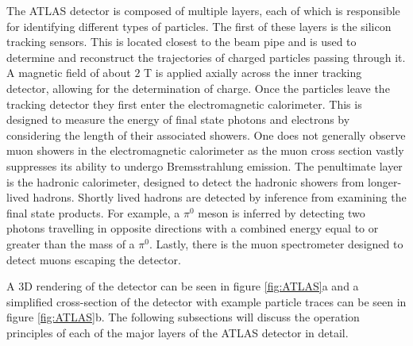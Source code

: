 The ATLAS detector is composed of multiple layers, each of which is responsible for identifying different types of particles. 
The first of these layers is the silicon tracking sensors. 
This is located closest to the beam pipe and is used to determine and reconstruct the trajectories of charged particles passing through it.
A magnetic field of about $2$ T is applied axially across the inner tracking detector, allowing for the determination of charge.
Once the particles leave the tracking detector they first enter the electromagnetic calorimeter.
This is designed to measure the energy of final state photons and electrons by considering the length of their associated showers.
One does not generally observe muon showers in the electromagnetic calorimeter as the muon cross section vastly suppresses its ability to undergo Bremsstrahlung emission.
The penultimate layer is the hadronic calorimeter, designed to detect the hadronic showers from longer-lived hadrons.
Shortly lived hadrons are detected by inference from examining the final state products.
For example, a $\pi^{0}$ meson is inferred by detecting two photons travelling in opposite directions with a combined energy equal to or greater than the mass of a $\pi^{0}$. 
Lastly, there is the muon spectrometer designed to detect muons escaping the detector.

A 3D rendering of the detector can be seen in figure \ref{fig:ATLAS}a and a simplified cross-section of the detector with example particle traces can be seen in figure \ref{fig:ATLAS}b.
The following subsections will discuss the operation principles of each of the major layers of the ATLAS detector in detail.

